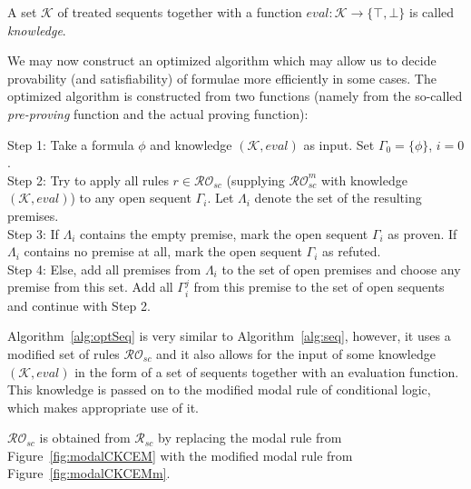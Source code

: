 \documentclass{entcs} \usepackage{entcsmacro}
\begin{document}
\begin{definition}
A set $\mathcal{K}$ of treated sequents together with a function
$eval:\mathcal{K}\rightarrow \{\top,\bot\}$ is called \emph{knowledge}.
\end{definition}

We may now construct an optimized algorithm which may allow us
to decide provability (and satisfiability) of formulae more efficiently
in some cases. The optimized algorithm is constructed from two functions
(namely from the so-called \emph{pre-proving} function and the actual proving
function):

\begin{algorithm}[h]
\begin{alg}
\begin{upshape}
  Step 1: Take a formula $\phi$ and knowledge $(\mathcal{K},eval)$ as
  input. Set $\Gamma_0 = \{\phi\}$, $i=0$.\\
  Step 2: Try to apply all rules $r\in \mathcal{RO}_{sc}$
  (supplying $\mathcal{RO}^m_{sc}$ with knowledge $(\mathcal{K},eval)$)
  to any open sequent $\Gamma_i$. Let
  $\Lambda_i$ denote the set of the resulting premises.\\
  Step 3: If $\Lambda_i$ contains the empty premise, mark the open
  sequent $\Gamma_i$ as proven. If $\Lambda_i$ contains no premise at
  all, mark the open sequent $\Gamma_i$ as refuted.\\
  Step 4: Else, add all premises from $\Lambda_i$ to the set of open
  premises and choose any premise from this set. Add all $\Gamma^j_i$
  from this premise to the set of open sequents and continue with
  Step 2.
\label{alg:optSeq}
\end{upshape}
\end{alg}
\end{algorithm}

Algorithm~\ref{alg:optSeq} is very similar to Algorithm~\ref{alg:seq},
however, it uses a modified
set of rules $\mathcal{RO}_{sc}$ and it also allows for the
input of some knowledge $(\mathcal{K},eval)$ in the form of a set of sequents
together with an evaluation function. This knowledge is passed on to
the modified modal rule of conditional logic, which makes appropriate use of it.

$\mathcal{RO}_{sc}$ is obtained from $\mathcal{R}_{sc}$ by replacing
the modal rule from Figure~\ref{fig:modalCKCEM} with the modified modal
rule from Figure~\ref{fig:modalCKCEMm}.
\end{document}
